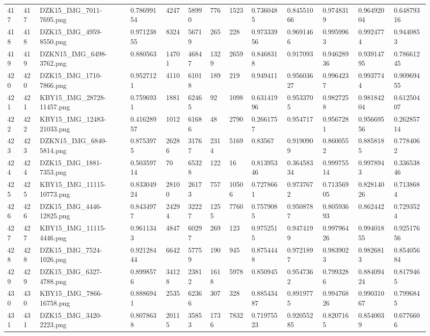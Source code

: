 \documentclass[11pt, a4paper, twoside]{report}
\begin{document}
\begin{longtable}[c]{@{}lllllllllllll@{}}
417 & 417 & DZK15\_IMG\_7011-7695.png & 0.78699154 & 4247 & 58990 & 776 & 1523 & 0.7360485 & 0.84551066 & 0.9748319 & 0.96492004 & 0.64879316 \\
418 & 418 & DZK15\_IMG\_4959-8550.png & 0.97123855 & 8324 & 56719 & 265 & 228 & 0.97333956 & 0.9691466 & 0.9959963 & 0.9924774 & 0.9440853 \\
419 & 419 & DZKN15\_IMG\_6498-3762.png & 0.880563 & 14701 & 46847 & 1329 & 2659 & 0.8468318 & 0.917093 & 0.94628936 & 0.93914795 & 0.78661245 \\
420 & 420 & DZK15\_IMG\_1710-7866.png & 0.9527121 & 4110 & 61018 & 189 & 219 & 0.949411 & 0.95603627 & 0.9964237 & 0.9937744 & 0.90969455 \\
421 & 421 & KBY15\_IMG\_28728-11457.png & 0.7596931 & 1881 & 62465 & 92 & 1098 & 0.63141996 & 0.9533705 & 0.9827258 & 0.98184204 & 0.61250407 \\
422 & 422 & KBY15\_IMG\_12483-21033.png & 0.41628957 & 1012 & 61686 & 48 & 2790 & 0.2661757 & 0.954717 & 0.9567281 & 0.95669556 & 0.26285714 \\
423 & 423 & DZKN15\_IMG\_6840-5814.png & 0.8753975 & 26286 & 31767 & 2314 & 5169 & 0.83567 & 0.9190909 & 0.8600552 & 0.8858185 & 0.7784062 \\
424 & 424 & DZK15\_IMG\_1881-7353.png & 0.50359714 & 70 & 65328 & 122 & 16 & 0.81395346 & 0.36458334 & 0.99975514 & 0.9978943 & 0.33653846 \\
425 & 425 & KBY15\_IMG\_11115-10773.png & 0.83304924 & 28100 & 26173 & 757 & 10506 & 0.7278661 & 0.9737672 & 0.71356905 & 0.82814026 & 0.7138684 \\
426 & 426 & DZK15\_IMG\_4446-12825.png & 0.8434977 & 24294 & 32227 & 1255 & 7760 & 0.7579085 & 0.9508787 & 0.80593693 & 0.862442 & 0.7293524 \\
427 & 427 & KBY15\_IMG\_11115-4446.png & 0.9611343 & 4847 & 60297 & 269 & 123 & 0.9752515 & 0.9474199 & 0.99796426 & 0.99401855 & 0.92517656 \\
428 & 428 & DZK15\_IMG\_7524-1026.png & 0.92128444 & 6642 & 57759 & 190 & 945 & 0.8754448 & 0.9721897 & 0.9839023 & 0.9826813 & 0.85405684 \\
429 & 429 & DZK15\_IMG\_6327-4788.png & 0.8998576 & 34128 & 23812 & 1618 & 5978 & 0.850945 & 0.9547362 & 0.7993286 & 0.88409424 & 0.8179465 \\
430 & 430 & KBY15\_IMG\_7866-16758.png & 0.8886941 & 2535 & 62366 & 307 & 328 & 0.88543487 & 0.8919775 & 0.99476826 & 0.99031067 & 0.7996845 \\
431 & 431 & DZK15\_IMG\_3420-2223.png & 0.8078638 & 20115 & 35853 & 1736 & 7832 & 0.71975523 & 0.92055285 & 0.8207165 & 0.8540039 & 0.6776606 \\

\end{longtable}
\end{document}
